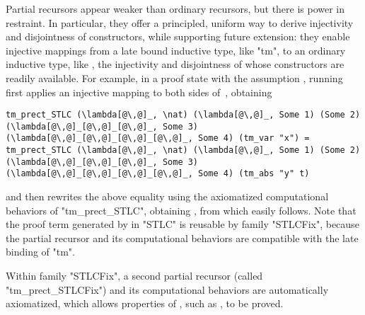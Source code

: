 Partial recursors appear weaker than ordinary recursors,
but there is power in restraint.
In particular,
they offer a principled, uniform way to derive injectivity and disjointness of
constructors, while supporting future extension:
they enable injective mappings from a late bound inductive
type, like "tm", to an ordinary inductive type, like \lsti{\nat},
the injectivity and disjointness of whose constructors are readily
available.
%
For example, in a proof state with the assumption ,
running  first applies an injective mapping to
both sides of~, obtaining

\begin{centered}
\begin{minipage}{.98\textwidth}
\begin{lstlisting}[basicstyle=\fontsize{8.25}{9}\ttfamily]
tm_prect_STLC (\lambda[@\,@]_, \nat) (\lambda[@\,@]_, Some 1) (Some 2) (\lambda[@\,@]_[@\,@]_[@\,@]_, Some 3) (\lambda[@\,@]_[@\,@]_[@\,@]_[@\,@]_, Some 4) (tm_var "x") =
tm_prect_STLC (\lambda[@\,@]_, \nat) (\lambda[@\,@]_, Some 1) (Some 2) (\lambda[@\,@]_[@\,@]_[@\,@]_, Some 3) (\lambda[@\,@]_[@\,@]_[@\,@]_[@\,@]_, Some 4) (tm_abs "y" t)
\end{lstlisting}
\end{minipage}
\end{centered}

\noindent
and then rewrites the above equality using the axiomatized computational behaviors
of "tm_prect_STLC",
obtaining ,
from which  easily follows.
%
Note that the proof term generated by  in "STLC"
is reusable by family "STLCFix", because the partial recursor and its
computational behaviors are compatible with the late binding of "tm".

Within family "STLCFix", a second partial recursor
(called "tm_prect_STLCFix") and its computational behaviors are automatically axiomatized,
which allows properties of , such as
, to be proved.



\ifShowOldWriting

\newpage

